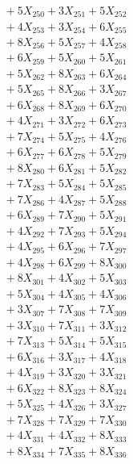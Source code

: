 \documentclass[a4paper,10pt]{article}
\begin{document}
{\begin{align}
&\;  + 5 X_{250} + 3 X_{251} + 5 X_{252} \\[0.3ex]
&\;  + 4 X_{253} + 3 X_{254} + 6 X_{255} \\[0.3ex]
&\;  + 8 X_{256} + 5 X_{257} + 4 X_{258} \\[0.3ex]
&\;  + 6 X_{259} + 5 X_{260} + 5 X_{261} \\[0.3ex]
&\;  + 5 X_{262} + 8 X_{263} + 6 X_{264} \\[0.3ex]
&\;  + 5 X_{265} + 8 X_{266} + 3 X_{267} \\[0.3ex]
&\;  + 6 X_{268} + 8 X_{269} + 6 X_{270} \\[0.3ex]
&\;  + 4 X_{271} + 3 X_{272} + 6 X_{273} \\[0.3ex]
&\;  + 7 X_{274} + 5 X_{275} + 4 X_{276} \\[0.3ex]
&\;  + 6 X_{277} + 6 X_{278} + 5 X_{279} \\[0.5ex]\allowbreak
&\;  + 8 X_{280} + 6 X_{281} + 5 X_{282} \\[0.3ex]
&\;  + 7 X_{283} + 5 X_{284} + 5 X_{285} \\[0.3ex]
&\;  + 7 X_{286} + 4 X_{287} + 5 X_{288} \\[0.3ex]
&\;  + 6 X_{289} + 7 X_{290} + 5 X_{291} \\[0.3ex]
&\;  + 4 X_{292} + 7 X_{293} + 5 X_{294} \\[0.3ex]
&\;  + 4 X_{295} + 6 X_{296} + 7 X_{297} \\[0.3ex]
&\;  + 4 X_{298} + 6 X_{299} + 8 X_{300} \\[0.3ex]
&\;  + 8 X_{301} + 4 X_{302} + 5 X_{303} \\[0.3ex]
&\;  + 5 X_{304} + 4 X_{305} + 4 X_{306} \\[0.3ex]
&\;  + 3 X_{307} + 7 X_{308} + 7 X_{309} \\[0.5ex]\allowbreak
&\;  + 3 X_{310} + 7 X_{311} + 3 X_{312} \\[0.3ex]
&\;  + 7 X_{313} + 5 X_{314} + 5 X_{315} \\[0.3ex]
&\;  + 6 X_{316} + 3 X_{317} + 4 X_{318} \\[0.3ex]
&\;  + 4 X_{319} + 3 X_{320} + 3 X_{321} \\[0.3ex]
&\;  + 6 X_{322} + 8 X_{323} + 8 X_{324} \\[0.3ex]
&\;  + 5 X_{325} + 4 X_{326} + 3 X_{327} \\[0.3ex]
&\;  + 7 X_{328} + 7 X_{329} + 7 X_{330} \\[0.3ex]
&\;  + 4 X_{331} + 4 X_{332} + 8 X_{333} \\[0.3ex]
&\;  + 8 X_{334} + 7 X_{335} + 8 X_{336} \\[0.3ex]

\end{align}}
\end{document}
